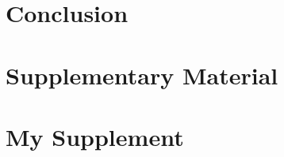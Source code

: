 \documentclass[a4paper]{article}
\begin{document}
\section{Conclusion}


\newpage
\printbibliography

\newpage
\section*{Supplementary Material}

\renewcommand{\thesection}{S\arabic{section}}
\setcounter{section}{0}

\section{My Supplement}

\newpage
\thispagestyle{empty}

\end{document}
